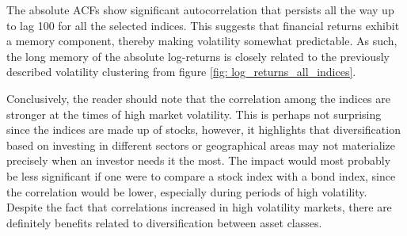 The absolute ACFs show significant autocorrelation that persists all the way up to lag 100 for all the selected indices. This suggests that financial returns exhibit a memory component, thereby making volatility somewhat predictable. As such, the long memory of the absolute log-returns is closely related to the previously described volatility clustering from figure \ref{fig: log_returns_all_indices}.

Conclusively, the reader should note that the correlation among the indices are stronger at the times of high market volatility. This is perhaps not surprising since the indices are made up of stocks, however, it highlights that diversification based on investing in different sectors or geographical areas may not materialize precisely when an investor needs it the most. The impact would most probably be less significant if one were to compare a stock index with a bond index, since the correlation would be lower, especially during periods of high volatility. Despite the fact that correlations increased in high volatility markets, there are definitely benefits related to diversification between asset classes.